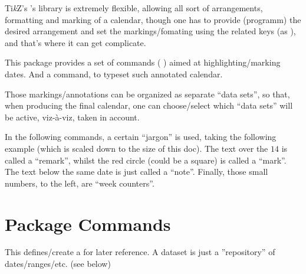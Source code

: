 \documentclass{article}
\begin{document}
Ti\emph{k}Z's 's library is extremely flexible, allowing all sort of arrangements, formatting and marking of a calendar, though one has to provide (programm) the desired arrangement and set the markings/fomating using the related keys (as ), and that's where it can get complicate.

This package provides a set of commands ( \tsobj{\setcountingweeks,\suppresscouting,\setdates,\setranges,\sethighlightdates} ) aimed at  highlighting/marking dates. And a command, \tsobj{\calendarnotes} to typeset such annotated calendar.

Those markings/annotations can be organized as separate ``data sets'', so that, when producing the final calendar, one can choose/select which ``data sets'' will be active, viz-à-viz, taken in account.

In the following commands, a certain ``jargon'' is used, taking the following example (which is scaled down to the size of this doc). The text over the $14$ is called a ``remark'', whilst the red circle (could be a square) is called a ``mark''. The text below the same date is just called a ``note''. Finally, those small numbers, to the left, are ``week counters''.

\begin{codestore}[demoA]

\end{codestore}




\section{Package Commands}
\begin{codedescribe}{}
\begin{codesyntax}%
\end{codesyntax}
This defines/create a  for later reference. A dataset is just a ''repository'' of dates/ranges/etc. (see below)
\end{codedescribe}
\end{document}
